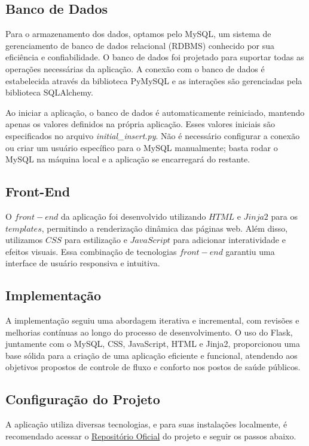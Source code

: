 \documentclass[conference, a4paper, 12pt]{IEEEtran}
\begin{document}

\subsection{Banco de Dados}
Para o armazenamento dos dados, optamos pelo MySQL, um sistema de gerenciamento de banco de dados relacional (RDBMS) conhecido por sua eficiência e confiabilidade. O banco de dados foi projetado para suportar todas as operações necessárias da aplicação. A conexão com o banco de dados é estabelecida através da biblioteca PyMySQL e as interações são gerenciadas pela biblioteca SQLAlchemy.

Ao iniciar a aplicação, o banco de dados é automaticamente reiniciado, mantendo apenas os valores definidos na própria aplicação. Esses valores iniciais são especificados no arquivo \emph{initial\_insert.py}. Não é necessário configurar a conexão ou criar um usuário específico para o MySQL manualmente; basta rodar o MySQL na máquina local e a aplicação se encarregará do restante.



\subsection{Front-End}
O $front-end$ da aplicação foi desenvolvido utilizando $HTML$ e $Jinja2$ para os $templates$, permitindo a renderização dinâmica das páginas web. Além disso, utilizamos $CSS$ para estilização e $JavaScript$ para adicionar interatividade e efeitos visuais. Essa combinação de tecnologias $front-end$ garantiu uma interface de usuário responsiva e intuitiva.

\subsection{Implementação}
A implementação seguiu uma abordagem iterativa e incremental, com revisões e melhorias contínuas ao longo do processo de desenvolvimento. O uso do Flask, juntamente com o MySQL, CSS, JavaScript, HTML e Jinja2, proporcionou uma base sólida para a criação de uma aplicação eficiente e funcional, atendendo aos objetivos propostos de controle de fluxo e conforto nos postos de saúde públicos.

\subsection{Configuração do Projeto}
A aplicação utiliza diversas tecnologias, e para suas instalações localmente, é recomendado acessar o \href{https://github.com/Lucas-LPG/gws}{Repositório Oficial} do projeto e seguir os passos abaixo.
\end{document}
